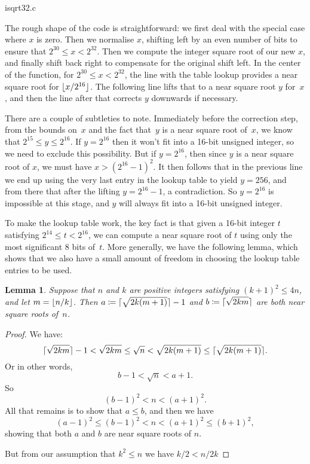 \documentclass[a4paper]{article}
\DeclarePairedDelimiter\floor{\lfloor}{\rfloor}
\DeclarePairedDelimiter\ceil{\lceil}{\rceil}
\newcommand{\csqrt}[1]{\ceil{\sqrt{#1}}}
\theoremstyle{plain}
\newtheorem{lemma}[theorem]{Lemma}
\theoremstyle{definition}
\begin{document}

  {isqrt32.c}

The rough shape of the code is straightforward: we first deal with
the special case where $x$ is zero. Then we normalise $x$, shifting left
by an even number of bits to ensure that $2^{30} \le x < 2^{32}$. Then
we compute the integer square root of our new $x$, and finally shift back
right to compensate for the original shift left. In the center of the function,
for $2^{30} \le x < 2^{32}$, the line with the table lookup provides a near
square root for $\floor{x / 2^{16}}$. The following line lifts that to a near
square root $y$ for~$x$, and then the line after that corrects $y$ downwards if
necessary.

There are a couple of subtleties to note. Immediately before the correction
step, from the bounds on~$x$ and the fact that~$y$ is a near square root
of~$x$, we know that $2^{15} \le y \le 2^{16}$. If $y = 2^{16}$ then it
won't fit into a 16-bit unsigned integer, so we need to exclude this
possibility. But if $y = 2^{16}$, then since $y$ is a near square root of $x$,
we must have $x > (2^{16} - 1)^2$. It then follows that in the previous line we
end up using the very last entry in the lookup table to yield $y = 256$, and
from there that after the lifting $y = 2^{16} - 1$, a contradiction. So $y =
2^{16}$ is impossible at this stage, and $y$ will always fit into a 16-bit
unsigned integer.

To make the lookup table work, the key fact is that given a 16-bit integer $t$
satisfying $2^{14} \le t < 2^{16}$, we can compute a near square root of $t$
using only the most significant 8 bits of~$t$. More generally, we have the
following lemma, which shows that we also have a small amount of freedom in
choosing the lookup table entries to be used.

\begin{lemma} Suppose that $n$ and $k$ are positive integers satisfying
  $(k+1)^2 \le 4n$, and let $m = \floor{n / k}$.
  Then $a \coloneqq \csqrt{2k(m+1)} - 1$ and $b \coloneqq \csqrt{2km}$
  are both near square roots of~$n$.
\end{lemma}

\begin{proof}
  We have:
    $$\csqrt{2km} - 1
      < \sqrt{2km}
      \le \sqrt n
      < \sqrt{2k(m+1)}
      \le \csqrt{2k(m+1)}.$$
  Or in other words,
    $$b - 1 < \sqrt n < a + 1.$$
  So
    $$(b - 1)^2 < n < (a + 1)^2.$$
  All that remains is to show that $a \le b$, and then we have
    $$(a - 1)^2 \le (b - 1)^2 < n < (a + 1)^2 \le (b + 1)^2,$$
  showing that both $a$ and $b$ are near square roots of $n$.

  But from our assumption that $k^2 \le n$ we have $k/2 < n / 2k$

\end{proof}
\end{document}
